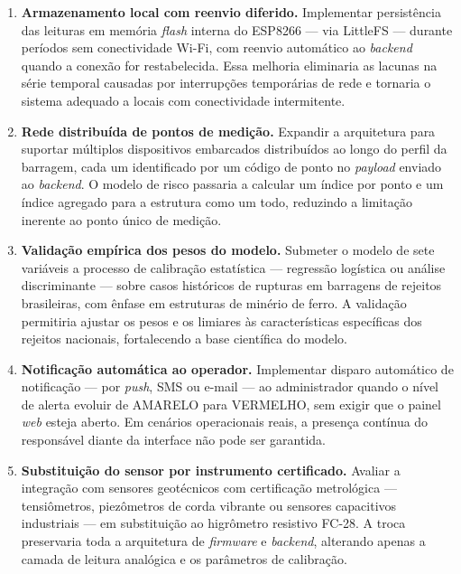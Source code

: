 \begin{enumerate}

  \item \textbf{Armazenamento local com reenvio diferido.}
  Implementar persistência das leituras em memória \textit{flash}
  interna do ESP8266 --- via LittleFS --- durante períodos sem
  conectividade Wi-Fi, com reenvio automático ao \textit{backend}
  quando a conexão for restabelecida. Essa melhoria eliminaria as
  lacunas na série temporal causadas por interrupções temporárias de
  rede e tornaria o sistema adequado a locais com conectividade
  intermitente.

  \item \textbf{Rede distribuída de pontos de medição.}
  Expandir a arquitetura para suportar múltiplos dispositivos
  embarcados distribuídos ao longo do perfil da barragem, cada um
  identificado por um código de ponto no \textit{payload} enviado ao
  \textit{backend}. O modelo de risco passaria a calcular um índice
  por ponto e um índice agregado para a estrutura como um todo,
  reduzindo a limitação inerente ao ponto único de medição.

  \item \textbf{Validação empírica dos pesos do modelo.}
  Submeter o modelo de sete variáveis a processo de calibração
  estatística --- regressão logística ou análise discriminante ---
  sobre casos históricos de rupturas em barragens de rejeitos
  brasileiras, com ênfase em estruturas de minério de ferro. A
  validação permitiria ajustar os pesos e os limiares às
  características específicas dos rejeitos nacionais, fortalecendo
  a base científica do modelo.

  \item \textbf{Notificação automática ao operador.}
  Implementar disparo automático de notificação --- por
  \textit{push}, SMS ou e-mail --- ao administrador quando o nível
  de alerta evoluir de AMARELO para VERMELHO, sem exigir que o
  painel \textit{web} esteja aberto. Em cenários operacionais
  reais, a presença contínua do responsável diante da interface não
  pode ser garantida.

  \item \textbf{Substituição do sensor por instrumento certificado.}
  Avaliar a integração com sensores geotécnicos com certificação
  metrológica --- tensiômetros, piezômetros de corda vibrante ou
  sensores capacitivos industriais --- em substituição ao
  higrômetro resistivo FC-28. A troca preservaria toda a arquitetura
  de \textit{firmware} e \textit{backend}, alterando apenas a
  camada de leitura analógica e os parâmetros de calibração.


\end{enumerate}
